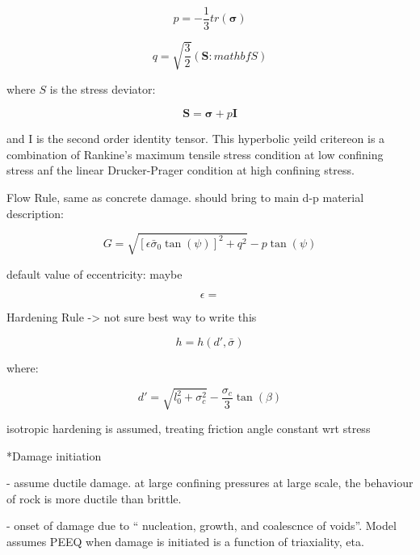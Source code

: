 \begin{equation}
p=-\frac{1}{3}tr\left(\boldsymbol{\sigma}\right)\label{eqn:druc3}
\end{equation}


\begin{equation}
q=\sqrt{\frac{3}{2}}\left(\mathbf{S}:mathbf{S}\right)\label{eqn:druc4}
\end{equation}


where $S$ is the stress deviator:

\begin{equation}
\mathbf{S}=\boldsymbol{\sigma}+p\mathbf{I}\label{eqn:druc4-1}
\end{equation}


and I is the second order identity tensor. This hyperbolic yeild critereon
is a combination of Rankine's maximum tensile stress condition at
low confining stress anf the linear Drucker-Prager condition at high
confining stress.

Flow Rule, same as concrete damage. should bring to main d-p material
description:

\begin{equation}
G=\sqrt{\left[\epsilon\bar{\sigma}_{0}\tan\left(\psi\right)\right]^{2}+q^{2}}-p\tan\left(\psi\right)\label{eqn:druc5}
\end{equation}


default value of eccentricity: maybe

\begin{equation}
\epsilon=\label{eqn:druc5-1}
\end{equation}


Hardening Rule -> not sure best way to write this

\begin{equation}
h=h\left(d',\bar{\sigma}\right)\label{eqn:druc6}
\end{equation}


where:

\begin{equation}
d'=\sqrt{l_{0}^{2}+\sigma_{c}^{2}}-\frac{\sigma_{c}}{3}\tan\left(\beta\right)\label{eqn:druc6-1}
\end{equation}


isotropic hardening is assumed, treating friction angle constant wrt
stress

{*}Damage initiation

- assume ductile damage. at large confining pressures at large scale,
the behaviour of rock is more ductile than brittle.

- onset of damage due to `` nucleation, growth, and coalescnce of
voids''. Model assumes PEEQ when damage is initiated is a function
of triaxiality, eta.

